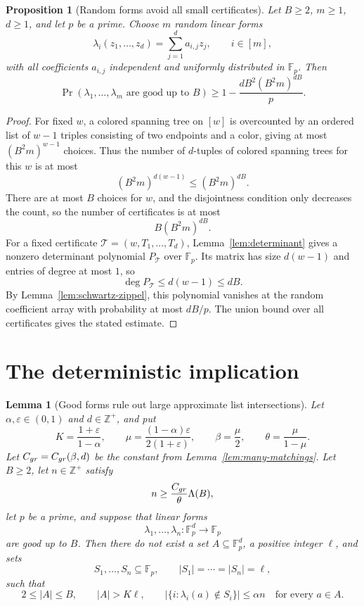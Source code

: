 \documentclass[10pt,a4paper]{amsart}
\newtheorem{lemma}[theorem]{Lemma}
\newtheorem{proposition}[theorem]{Proposition}
\newcommand{\Fp}{\mathbb{F}_p}
\newcommand{\Zpos}{\mathbb{Z}^{+}}
\begin{document}
\begin{proposition}[Random forms avoid all small certificates]\label{prop:random-good}
Let \(B\ge2\), \(m\ge1\), \(d\ge1\), and let \(p\) be a prime. Choose \(m\) random linear forms
\[
\lambda_i(z_1,\ldots,z_d)=\sum_{j=1}^d a_{i,j}z_j,
\qquad i\in[m],
\]
with all coefficients \(a_{i,j}\) independent and uniformly distributed in \(\Fp\). Then
\[
\Pr(\lambda_1,\ldots,\lambda_m\text{ are good up to }B)
\ge
1-\frac{dB^2(B^2m)^{dB}}{p}.
\]
\end{proposition}

\begin{proof}
For fixed \(w\), a colored spanning tree on \([w]\) is overcounted by an ordered list of \(w-1\) triples consisting of two endpoints and a color, giving at most \((B^2m)^{w-1}\) choices. Thus the number of \(d\)-tuples of colored spanning trees for this \(w\) is at most
\[
(B^2m)^{d(w-1)}\le(B^2m)^{dB}.
\]
There are at most \(B\) choices for \(w\), and the disjointness condition only decreases the count, so the number of certificates is at most
\[
B(B^2m)^{dB}.
\]
For a fixed certificate \(\mathcal T=(w,T_1,\ldots,T_d)\), Lemma~\ref{lem:determinant} gives a nonzero determinant polynomial \(P_{\mathcal T}\) over \(\Fp\). Its matrix has size \(d(w-1)\) and entries of degree at most \(1\), so
\[
\deg P_{\mathcal T}\le d(w-1)\le dB.
\]
By Lemma~\ref{lem:schwartz-zippel}, this polynomial vanishes at the random coefficient array with probability at most \(dB/p\). The union bound over all certificates gives the stated estimate.
\end{proof}


\section{The deterministic implication}

\begin{lemma}[Good forms rule out large approximate list intersections]\label{lem:deterministic}
Let $\alpha,\varepsilon\in(0,1)$ and $d\in\Zpos$, and put
\[
K=\frac{1+\varepsilon}{1-\alpha},
\qquad
\mu=\frac{(1-\alpha)\varepsilon}{2(1+\varepsilon)},
\qquad
\beta=\frac\mu2,
\qquad
\theta=\frac{\mu}{1-\mu}.
\]
Let $C_{\rm gr}=C_{\rm gr}(\beta,d)$ be the constant from Lemma~\ref{lem:many-matchings}. Let $B\ge2$, let $n\in\Zpos$ satisfy
\[
n\ge \frac{C_{\rm gr}}{\theta}\Lambda(B),
\]
let $p$ be a prime, and suppose that linear forms
\[
\lambda_1,\ldots,\lambda_n:\Fp^d\to\Fp
\]
are good up to $B$. Then there do not exist a set $A\subseteq\Fp^d$, a positive integer $\ell$, and sets
\[
S_1,\ldots,S_n\subseteq\Fp,
\qquad |S_1|=\cdots=|S_n|=\ell,
\]
such that
\[
2\le |A|\le B,
\qquad
|A|>K\ell,
\qquad
\left|\{i:\lambda_i(a)\notin S_i\}\right|\le \alpha n
\quad\text{for every }a\in A.
\]
\end{lemma}
\end{document}
